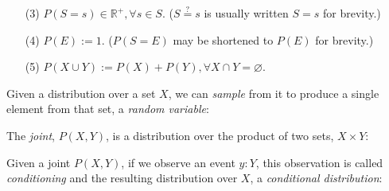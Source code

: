 \documentclass[11pt]{article}
\begin{document}
    \begin{itemize}
      \itemsep-1em
      \item [(3)] $P(S = s) \in \mathbb{R}^{+}, \forall s \in S$. ($S \overset{?}{=} s$ is usually written $S = s$ for brevity.) \\
      \item [(4)] $P(E) := 1$. ($P(S = E)$ may be shortened to $P(E)$ for brevity.) \\
      \item [(5)] $P(X \cup Y) := P(X) + P(Y), \forall X \cap Y = \varnothing$.
    \end{itemize}

    \noindent Given a distribution over a set $X$, we can \textit{sample} from it to produce a single element from that set, a \textit{random variable}:

    \begin{prooftree}
    \end{prooftree}

%

    \noindent The \textit{joint}, $P(X, Y)$, is a distribution over the product of two sets, $X \times Y$:

    \begin{prooftree}
    \end{prooftree}

    \noindent Given a joint $P(X, Y)$, if we observe an event $y: Y$, this observation is called \textit{conditioning} and the resulting distribution over $X$, a \textit{conditional distribution}:

    \begin{prooftree}
    \end{prooftree}
\end{document}
